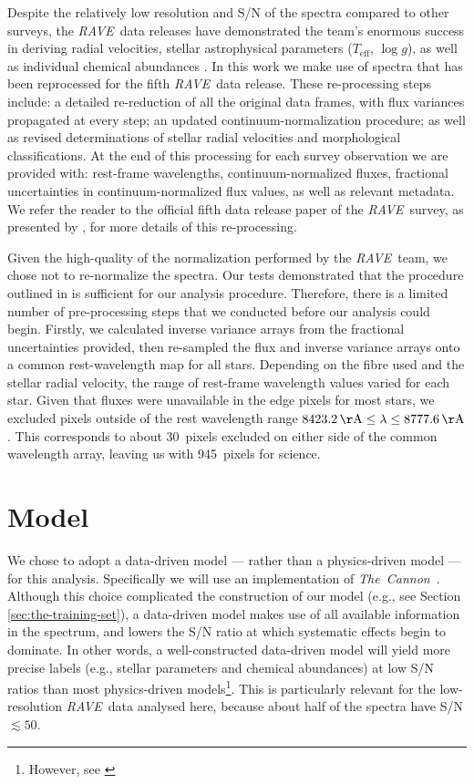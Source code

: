 \documentclass[preprint,trackchanges]{aastex}
\newcommand{\project}[1]{\textsl{#1}}
\newcommand{\thecannon}{\project{The~Cannon}}
\newcommand{\acronym}[1]{{\small{#1}}}
\newcommand{\rave}{\project{\acronym{RAVE}}}
\newcommand{\logg}{\log g}
\newcommand{\teff}{T_{\mathrm{eff}}}
\begin{document}
Despite the relatively low resolution and S/N of the spectra compared to other
surveys, the \rave\ data releases have demonstrated the team's enormous success 
in deriving radial velocities, stellar astrophysical parameters ($\teff$, $\logg$),
as well as individual chemical abundances \citep{Steinmetz_2006,Zwitter_2008,
Siebert_2011,Kordopatis_2013, Kunder_2016}.  In this work we make use of spectra
that has been reprocessed for the fifth \rave\ data release.  These re-processing
steps include: a detailed re-reduction of all the original data frames, with flux
variances propagated at every step; an updated continuum-normalization procedure;
as well as revised determinations of stellar radial velocities and morphological
classifications. At the end of this processing for each survey observation we are 
provided with: rest-frame wavelengths, continuum-normalized fluxes, fractional 
uncertainties in continuum-normalized flux values, as well as relevant metadata.  
We refer the reader to the official fifth data release paper of the \rave\ survey, 
as presented by \citet{Kunder_2016}, for more details of this re-processing.


Given the high-quality of the normalization performed by the \rave\ team, we chose
not to re-normalize the spectra.  Our tests demonstrated that the procedure 
outlined in \citet{Kunder_2016} is sufficient for our analysis procedure. Therefore,
there is a limited number of pre-processing steps that we conducted before our
analysis could begin.  Firstly, we calculated inverse variance arrays from the
fractional uncertainties provided, then re-sampled the flux and inverse variance
arrays onto a common rest-wavelength map for all stars.  Depending on the fibre 
used and the stellar radial velocity, the range of rest-frame wavelength values
varied for each star.  Given that fluxes were unavailable in the edge pixels for 
most stars, we excluded pixels outside of the rest wavelength range 
$8423.2\,{\rm \AA} \le \lambda \le 8777.6\,{\rm \AA}$.  This corresponds to about
30~pixels excluded on either side of the common wavelength array, leaving us with
945~pixels for science.


\section{Model}
\label{sec:model}

We chose to adopt a data-driven model --- rather than a physics-driven model ---
for this analysis.  Specifically we will use an implementation of \thecannon\
\citep{Ness_2015}.  Although this choice complicated the construction of our model
(e.g., see Section \ref{sec:the-training-set}), a data-driven model makes
use of all available information in the spectrum, and lowers the S/N ratio at
which systematic effects begin to dominate.  In other words, a well-constructed
data-driven model will yield more precise labels (e.g., stellar parameters and
chemical abundances) at low S/N ratios than most physics-driven models\footnote{
However, see \citet{Casey_2016}}.  This is particularly relevant for the 
low-resolution \rave\ data analysed here, because about half of the spectra have
S/N $\lesssim 50$. 
\end{document}
